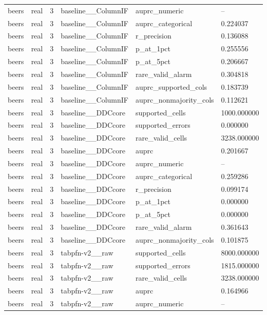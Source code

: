 \begin{tabular}{llllll}
beers & real & 3 & baseline\_\_ColumnIF & auprc\_numeric & -- \\
beers & real & 3 & baseline\_\_ColumnIF & auprc\_categorical & 0.224037 \\
beers & real & 3 & baseline\_\_ColumnIF & r\_precision & 0.136088 \\
beers & real & 3 & baseline\_\_ColumnIF & p\_at\_1pct & 0.255556 \\
beers & real & 3 & baseline\_\_ColumnIF & p\_at\_5pct & 0.206667 \\
beers & real & 3 & baseline\_\_ColumnIF & rare\_valid\_alarm & 0.304818 \\
beers & real & 3 & baseline\_\_ColumnIF & auprc\_supported\_cols & 0.183739 \\
beers & real & 3 & baseline\_\_ColumnIF & auprc\_nonmajority\_cols & 0.112621 \\
beers & real & 3 & baseline\_\_DDCcore & supported\_cells & 1000.000000 \\
beers & real & 3 & baseline\_\_DDCcore & supported\_errors & 0.000000 \\
beers & real & 3 & baseline\_\_DDCcore & rare\_valid\_cells & 3238.000000 \\
beers & real & 3 & baseline\_\_DDCcore & auprc & 0.201667 \\
beers & real & 3 & baseline\_\_DDCcore & auprc\_numeric & -- \\
beers & real & 3 & baseline\_\_DDCcore & auprc\_categorical & 0.259286 \\
beers & real & 3 & baseline\_\_DDCcore & r\_precision & 0.099174 \\
beers & real & 3 & baseline\_\_DDCcore & p\_at\_1pct & 0.000000 \\
beers & real & 3 & baseline\_\_DDCcore & p\_at\_5pct & 0.000000 \\
beers & real & 3 & baseline\_\_DDCcore & rare\_valid\_alarm & 0.361643 \\
beers & real & 3 & baseline\_\_DDCcore & auprc\_nonmajority\_cols & 0.101875 \\
beers & real & 3 & tabpfn-v2\_\_raw & supported\_cells & 8000.000000 \\
beers & real & 3 & tabpfn-v2\_\_raw & supported\_errors & 1815.000000 \\
beers & real & 3 & tabpfn-v2\_\_raw & rare\_valid\_cells & 3238.000000 \\
beers & real & 3 & tabpfn-v2\_\_raw & auprc & 0.164966 \\
beers & real & 3 & tabpfn-v2\_\_raw & auprc\_numeric & -- \\

\end{tabular}

